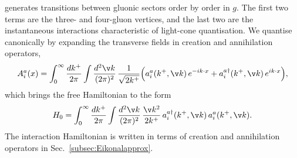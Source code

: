 generates transitions between gluonic sectors order by order in $g$. The first two terms are the
three- and four-gluon vertices, and the last two are the instantaneous interactions characteristic
of light-cone quantisation. We quantise canonically by expanding the transverse fields in creation
and annihilation operators,
\begin{align}\label{eq:gaugequant}
A_{i}^{a}(x)=\int_{0}^{\infty}\frac{dk^{+}}{2\pi}\int\frac{d^{2}\v k}{(2\pi)^{2}}\,\frac{1}{\sqrt{2k^{+}}}
\Big(a_{i}^{a}(k^{+},\v k)\,e^{-ik\cdot x}+a_{i}^{a\dagger}(k^{+},\v k)\,e^{ik\cdot x}\Big),
\end{align}
which brings the free Hamiltonian to the form
\begin{align}\label{eq:freecan}
H_{0}=\int_{0}^{\infty}\frac{dk^{+}}{2\pi}\int\frac{d^{2}\v k}{(2\pi)^{2}}\,\frac{\v k^{2}}{2k^{+}}\,
a_{i}^{a\dagger}(k^{+},\v k)\,a_{i}^{a}(k^{+},\v k).
\end{align}
The interaction Hamiltonian is written in terms of creation and annihilation operators in
Sec.~\ref{subsec:Eikonalapprox}.

